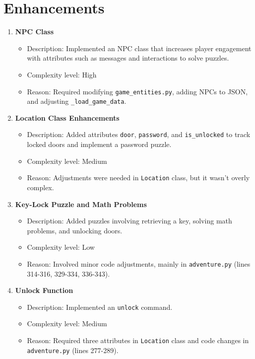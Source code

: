 \documentclass[11pt]{article}
\begin{document}
\section*{Enhancements}
\begin{enumerate}
    \item \textbf{NPC Class}
    \begin{itemize}
        \item Description: Implemented an NPC class that increases player engagement  
        with attributes such as messages and interactions to solve puzzles.
        \item Complexity level: High
        \item Reason: Required modifying \texttt{game\_entities.py}, adding NPCs to JSON,  
        and adjusting \texttt{\_load\_game\_data}.
    \end{itemize}

    \item \textbf{Location Class Enhancements}
    \begin{itemize}
        \item Description: Added attributes \texttt{door}, \texttt{password}, and \texttt{is\_unlocked}  
        to track locked doors and implement a password puzzle.
        \item Complexity level: Medium
        \item Reason: Adjustments were needed in \texttt{Location} class, but it wasn’t overly complex.
    \end{itemize}

    \item \textbf{Key-Lock Puzzle and Math Problems}
    \begin{itemize}
        \item Description: Added puzzles involving retrieving a key, solving math problems, and unlocking doors.
        \item Complexity level: Low
        \item Reason: Involved minor code adjustments, mainly in \texttt{adventure.py}  
        (lines 314-316, 329-334, 336-343).
    \end{itemize}

    \item \textbf{Unlock Function}
    \begin{itemize}
        \item Description: Implemented an \texttt{unlock} command.
        \item Complexity level: Medium
        \item Reason: Required three attributes in \texttt{Location} class and code changes in  
        \texttt{adventure.py} (lines 277-289).
    \end{itemize}
\end{enumerate}
\end{document}
